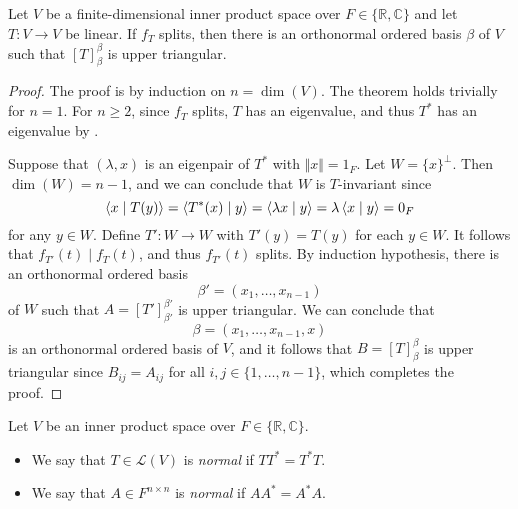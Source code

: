 \begin{theorem}
  \label{thm:schur}
  Let $V$ be a finite-dimensional inner product space over
  $F \in \{\mathbb{R}, \mathbb{C}\}$ and let $T: V \to V$ be linear.
  If $f_T$ splits, then there is an orthonormal ordered basis $\beta$ of $V$
  such that $[T]_\beta^\beta$ is upper triangular.
\end{theorem}
\begin{proof}
  The proof is by induction on $n = \dim(V)$.
  The theorem holds trivially for $n = 1$.
  For $n \geq 2$, since $f_T$ splits, $T$ has an eigenvalue, and thus $T^*$
  has an eigenvalue by .

  Suppose that $(\lambda, x)$ is an eigenpair of $T^*$ with
  $\Vert x \Vert = 1_F$.
  Let $W = \{x\}^\perp$.
  Then $\dim(W) = n - 1$, and we can conclude that $W$ is $T$-invariant since
  \begin{equation*}
    \left\langle x \; \middle| \; T(y) \right\rangle
    = \left\langle T^*(x) \; \middle| \; y \right\rangle
    = \left\langle \lambda x \; \middle| \; y \right\rangle
    = \lambda \left\langle x \; \middle| \; y \right\rangle
    = 0_F
  \end{equation*}
  for any $y \in W$.
  Define $T': W \to W$ with $T'(y) = T(y)$ for each $y \in W$.
  It follows that $f_{T'}(t) \mid f_T(t)$, and thus $f_{T'}(t)$ splits.
  By induction hypothesis, there is an orthonormal ordered basis
  \begin{equation*}
    \beta' = (x_1, \dots, x_{n-1})
  \end{equation*}
  of $W$ such that $A = [T']_{\beta'}^{\beta'}$
  is upper triangular.
  We can conclude that
  \begin{equation*}
    \beta = (x_1, \dots, x_{n-1}, x)
  \end{equation*}
  is an orthonormal ordered basis of $V$, and it follows that
  $B = [T]_\beta^\beta$ is upper triangular since $B_{ij} = A_{ij}$ for all
  $i, j \in \{1, \dots, n-1\}$, which completes the proof.
\end{proof}

\begin{definition}
  Let $V$ be an inner product space over $F \in \{\mathbb{R}, \mathbb{C}\}$.
  \begin{itemize}
    \item We say that $T \in \mathcal{L}(V)$ is \emph{normal} if $TT^* = T^*T$.
    \item We say that $A \in F^{n \times n}$ is \emph{normal} if $AA^* = A^*A$.
  \end{itemize}
\end{definition}

